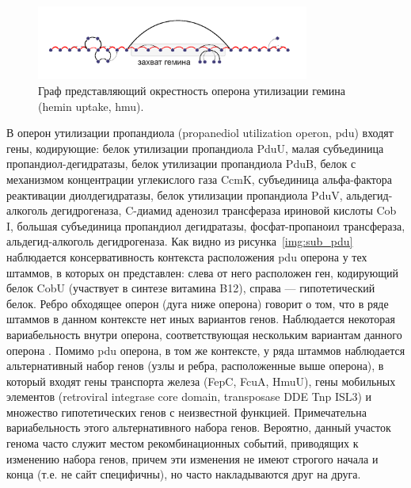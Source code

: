\begin{figure}[!ht] 
  \center
  \includegraphics[width=0.8\textwidth]{Dissertation/images/subgraphs/hemin.png}
  \caption{Граф представляющий окрестность оперона утилизации гемина (hemin uptake, hmu).}
  \label{img:sub_hem} 
\end{figure}

В оперон утилизации пропандиола (propanediol utilization operon, pdu) входят гены, кодирующие: белок утилизации пропандиола PduU, малая субъединица пропандиол-дегидратазы, белок утилизации пропандиола PduB, белок с механизмом концентрации углекислого газа CcmK, субъединица альфа-фактора реактивации диолдегидратазы, белок утилизации пропандиола PduV, альдегид-алкоголь дегидрогеназа, C-диамид аденозил трансфераза ириновой кислоты Cob I, большая субъединица  пропандиол дегидратазы, фосфат-пропаноил трансфераза, альдегид-алкоголь дегидрогеназа. Как видно из рисунка~\ref{img:sub_pdu} наблюдается консервативность контекста расположения pdu оперона у тех штаммов, в которых он представлен: слева от него расположен ген, кодирующий белок CobU  (участвует в синтезе витамина B12), справа --- гипотетический белок. Ребро обходящее оперон (дуга ниже оперона) говорит о том, что в ряде штаммов в данном контексте нет иных вариантов генов. Наблюдается некоторая вариабельность внутри оперона, соответствующая нескольким вариантам данного оперона \cite{rakitina2017genome}. Помимо pdu оперона, в том же контексте, у ряда штаммов наблюдается альтернативный набор генов (узлы и ребра, расположенные выше оперона), в который входят гены транспорта железа (FepC, FcuA, HmuU), гены мобильных элементов (retroviral integrase core domain, transposase DDE Tnp ISL3) и множество гипотетических генов с неизвестной функцией. Примечательна вариабельность этого альтернативного набора генов. Вероятно, данный участок генома часто служит местом рекомбинационных событий, приводящих к изменению набора генов, причем эти изменения не имеют строгого начала и конца (т.е. не сайт специфичны), но часто накладываются друг на друга. 

